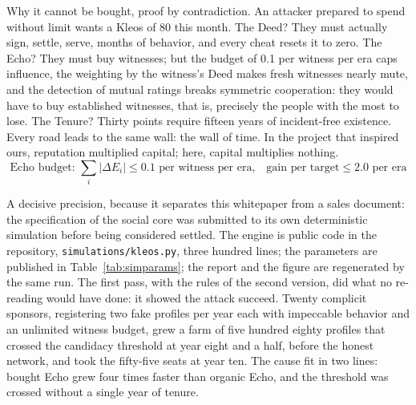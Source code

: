 Why it cannot be bought, proof by contradiction. An attacker prepared to
spend without limit wants a Kleos of 80 this month. The Deed? They must
actually sign, settle, serve, months of behavior, and every cheat resets
it to zero. The Echo? They must buy witnesses; but the budget of 0.1 per
witness per era caps influence, the weighting by the witness's Deed makes
fresh witnesses nearly mute, and the detection of mutual ratings breaks
symmetric cooperation: they would have to buy established witnesses,
that is, precisely the people with the most to lose. The Tenure? Thirty
points require fifteen years of incident-free existence. Every road leads
to the same wall: the wall of time. In the project that inspired ours,
reputation multiplied capital; here, capital multiplies nothing.
\begin{equation}\label{eq:echo}
\text{Echo budget: } \sum_i |\Delta E_i| \le 0.1 \text{ per witness per era,}
\quad \text{gain per target} \le 2.0 \text{ per era}
\end{equation}

A decisive precision, because it separates this whitepaper from a sales
document: the specification of the social core was submitted to its own
deterministic simulation before being considered settled. The engine is
public code in the repository, \texttt{simulations/kleos.py}, three
hundred lines; the parameters are published in
Table~\ref{tab:simparams}; the report and the figure are regenerated by
the same run. The first pass, with the rules of the
second version, did what no re-reading would have done: it showed the
attack succeed. Twenty complicit sponsors, registering two fake
profiles per year each with impeccable behavior and an unlimited
witness budget, grew a farm of five hundred eighty profiles that
crossed the candidacy threshold at year eight
and a half, before the honest network, and took the fifty-five seats at year
ten. The cause fit in two lines: bought Echo grew four times faster than
organic Echo, and the threshold was crossed without a single year of
tenure.

